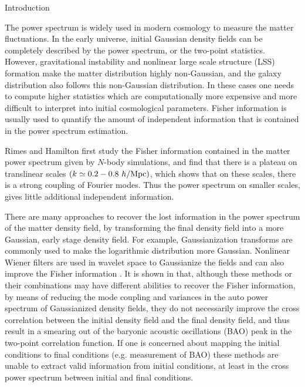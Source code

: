 \begin{section}{Introduction}\label{sec:introduction}  

The power spectrum is widely used in modern cosmology to measure the matter
fluctuations. In the early universe, initial Gaussian density fields
can be completely described by the power spectrum, or the two-point
statistics. However, gravitational instability and nonlinear large scale
structure (LSS) formation make the matter distribution highly
non-Gaussian, and the galaxy distribution also follows this non-Gaussian
distribution. In these cases one needs to compute higher statistics
which are computationally more expensive and more difficult to
interpret into initial cosmological parameters. Fisher information
is usually used to quantify the amount of independent information
that is contained in the power spectrum estimation.

Rimes and Hamilton \citep{bib:Rimes2006} first study the Fisher
information contained in the matter power
spectrum given by $N$-body simulations, and find that there is a
plateau on translinear scales $(k \simeq 0.2-0.8\ h/{\rm Mpc})$,
which shows that on these scales, there is a strong coupling of
Fourier modes. Thus the power spectrum on smaller scales, gives little
additional independent information.

There are many approaches to recover the lost information in the
power spectrum of the matter density field, by transforming the final
density field into a more Gaussian, early stage density field.
For example, Gaussianization transforms are commonly used
\cite{bib:Weinberg1992,bib:Mark2009} to make the logarithmic
distribution more Gaussian. Nonlinear Wiener filters are used
in wavelet space to Gaussianize the fields and can also improve
the Fisher information \cite{bib:Zhang2011,bib:Yu2012,bib:HarnoisD2013}.
It is shown in \cite{bib:HarnoisD2013} that, although these methods
or their combinations may have different abilities to recover
the Fisher information, by means of reducing the mode coupling
and variances in the auto power spectrum of Gaussianized
density fields, they do not necessarily improve the cross correlation
 between the initial density
field and the final density field, and thus result in a smearing
out of the baryonic acoustic oscillations (BAO) peak in the two-point
correlation function. If one is concerned about mapping
the initial conditions to final conditions (e.g. measurement of 
BAO) these methods are unable to
extract valid information from initial conditions, at least in
the cross power spectrum between initial and final conditions.


\end{section}
